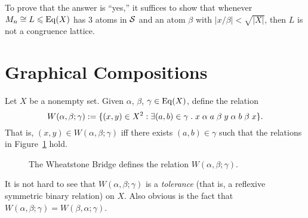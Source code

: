 \noindent To prove that the answer is ``yes,'' it suffices to show that 
whenever $M_n \cong L \leqslant \operatorname{Eq}(X)$ has 3 atoms in $\mathcal{S}$ and
an atom $\beta$ with $|x/\beta| < \sqrt{|X|}$, then $L$ is not a
congruence lattice.  

\section{Graphical Compositions}
Let $X$ be a nonempty set. Given $\alpha$, $\beta$, $\gamma \in \operatorname{Eq}(X)$,
define the relation 
\[
W(\alpha, \beta; \gamma) := \{(x,y) \in X^2 : \exists (a, b) \in \gamma
\; . \; x \mathrel{\alpha} a \mathrel{\beta} y \mathrel{\alpha} b \mathrel{\beta} x\}.
\]
That is, $(x,y) \in W(\alpha, \beta; \gamma)$ iff there exists $(a,b)\in \gamma$
such that the relations in Figure~\ref{fig:wsb} hold.

\newcommand\dotsize{1pt}

\begin{figure}[!h]
  \caption{The Wheatstone Bridge defines the relation 
    $W(\alpha, \beta; \gamma)$. }
  \label{fig:wsb}
\end{figure}
It is not hard to see that $W(\alpha, \beta; \gamma)$ is a 
\emph{tolerance} (that is, a reflexive symmetric binary relation)
on $X$.  Also obvious is the fact that 
$W(\alpha, \beta; \gamma) = W(\beta, \alpha; \gamma)$.

